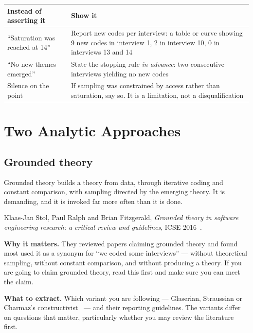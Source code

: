 \begin{center}
\small
\begin{tabular}{@{}L{4.4cm}L{9.9cm}@{}}
\toprule
\textbf{Instead of asserting it} & \textbf{Show it} \\
\midrule
``Saturation was reached at 14''
  & Report new codes per interview: a table or curve showing 9 new codes in
    interview 1, 2 in interview 10, 0 in interviews 13 and 14 \\
``No new themes emerged''
  & State the stopping rule \emph{in advance}: two consecutive interviews
    yielding no new codes \\
Silence on the point
  & If sampling was constrained by access rather than saturation, say so. It is
    a limitation, not a disqualification \\
\bottomrule
\end{tabular}
\end{center}

\section{Two Analytic Approaches}

\subsection{Grounded theory}

Grounded theory builds a theory from data, through iterative coding and
constant comparison, with sampling directed by the emerging theory. It is
demanding, and it is invoked far more often than it is done.

\begin{paperbox}
Klaas-Jan Stol, Paul Ralph and Brian Fitzgerald, \emph{Grounded theory in
software engineering research: a critical review and guidelines}, ICSE
2016~\cite{stol2016grounded}.

\medskip
\textbf{Why it matters.} They reviewed papers claiming grounded theory and
found most used it as a synonym for ``we coded some interviews'' --- without
theoretical sampling, without constant comparison, and without producing a
theory. If you are going to claim grounded theory, read this first and make
sure you can meet the claim.

\medskip
\textbf{What to extract.} Which variant you are following --- Glaserian,
Straussian or Charmaz's constructivist~\cite{charmaz2014constructing} --- and
their reporting guidelines. The variants differ on questions that matter,
particularly whether you may review the literature first.
\end{paperbox}

